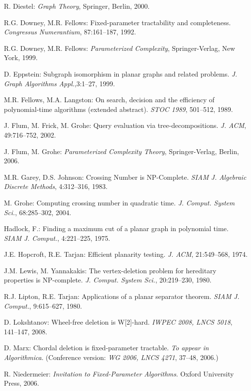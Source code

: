 \documentclass{llncs}
\begin{document}
\begin{thebibliography}{99}
R. Diestel: \emph{Graph Theory}, Springer, Berlin, 2000.

R.G. Downey, M.R. Fellows: Fixed-parameter tractability and completeness.
\emph{Congressus Numerantium}, 87:161--187, 1992.

R.G. Downey, M.R. Fellows:
\emph{Parameterized Complexity}, Springer-Verlag, New York, 1999.

D. Eppstein:
Subgraph isomorphism in planar graphs and related problems.
\emph{J. Graph Algorithms Appl.},3:1--27, 1999.

M.R. Fellows, M.A. Langston:
On search, decision and the efficiency of polynomial-time algorithms (extended abstract).
\emph{STOC 1989}, 501--512, 1989.

J. Flum, M. Frick, M. Grohe:
Query evaluation via tree-decompositions.
\emph{J. ACM}, 49:716--752, 2002.

J. Flum, M. Grohe:  \emph{Parameterized Complexity Theory}, Springer-Verlag, Berlin, 2006.

M.R. Garey, D.S. Johnson: Crossing Number is NP-Complete.
\emph{SIAM J. Algebraic Discrete Methods}, 4:312--316, 1983.

M. Grohe: Computing crossing number in quadratic time.
\emph{J. Comput. System Sci.}, 68:285--302, 2004.

Hadlock, F.:
Finding a maximum cut of a planar graph in polynomial time.
\emph{SIAM J. Comput.}, 4:221--225, 1975.

J.E. Hopcroft, R.E. Tarjan:
Efficient planarity testing.
\emph{J. ACM}, 21:549--568, 1974.

J.M. Lewis, M. Yannakakis:
The vertex-deletion problem for hereditary properties is NP-complete.
\emph{J. Comput. System Sci.}, 20:219--230, 1980.

R.J. Lipton, R.E. Tarjan:
Applications of a planar separator theorem.
\emph{SIAM J. Comput.}, 9:615--627, 1980.

D. Lokshtanov: Wheel-free deletion is W[2]-hard.
\emph{IWPEC 2008, LNCS 5018}, 141--147, 2008.

D. Marx: Chordal deletion is fixed-parameter tractable.
\emph{To appear in Algorithmica}.
(Conference version: \emph{WG 2006, LNCS 4271}, 37--48, 2006.)

R. Niedermeier: \emph{Invitation to Fixed-Parameter Algorithms}. Oxford University Press, 2006.


\end{thebibliography}
\end{document}
